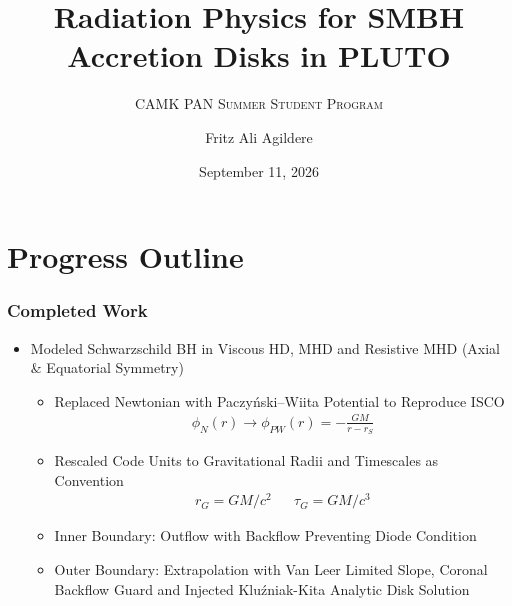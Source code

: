 


\author[F. A. Agildere]{Fritz Ali Agildere}

\date[Sep. 11, 2026]{September 11, 2026}

\title{Radiation Physics for SMBH Accretion Disks in PLUTO}
\subtitle{\textsc{CAMK PAN Summer Student Program}}

\institute[CAMK]{}


	\begin{frame}[noframenumbering]
		\titlepage
	\end{frame}

	\section{Progress Outline}

	\begin{frame}
		\frametitle{Completed Work}
		\begin{itemize}
			\item<2-> Modeled Schwarzschild BH in Viscous HD, MHD and Resistive MHD (Axial \& Equatorial Symmetry)
			\begin{itemize}
				\item<3-> Replaced Newtonian with Paczyński–Wiita Potential to Reproduce ISCO
						  \begin{align*}\phi_N(r) \rightarrow \phi_{PW}(r) = -\frac{GM}{r - r_S}\end{align*}
				\item<4-> Rescaled Code Units to Gravitational Radii and Timescales as Convention
						  \begin{align*}&&&& r_G = GM / c^2 && \tau_G = GM / c^3 &&&&\end{align*}
				\item<5-> Inner Boundary: Outflow with Backflow Preventing Diode Condition
				\item<6-> Outer Boundary: Extrapolation with Van Leer Limited Slope, Coronal\break
                          Backflow Guard and Injected Kluźniak-Kita Analytic Disk Solution
			\end{itemize}
		\end{itemize}
	\end{frame}

